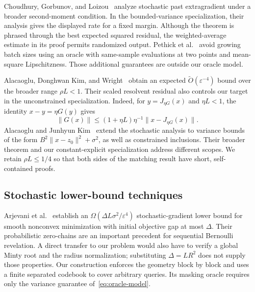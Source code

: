 \documentclass[11pt,a4paper]{article}
\newcommand{\eps}{\varepsilon}
\theoremstyle{definition}
\theoremstyle{remark}
\begin{document}
Choudhury, Gorbunov, and Loizou~\cite{cgl2023} analyze stochastic past
extragradient under a broader second-moment condition. In the bounded-variance
specialization, their analysis gives the displayed rate for a fixed margin.
Although the theorem is phrased through the best expected squared residual,
the weighted-average estimate in its proof permits randomized output.
Pethick et al.~\cite{pethick2023} avoid growing batch sizes using an oracle
with same-sample evaluations at two points and mean-square Lipschitzness.
Those additional guarantees are outside our oracle model.

Alacaoglu, Donghwan Kim, and Wright~\cite{akw2024} obtain an expected
$\widetilde O(\eps^{-4})$ bound over the broader range $\rho L<1$.
Their scaled resolvent residual also controls our target in the
unconstrained specialization. Indeed, for $y=J_{\eta G}(x)$ and $\eta L<1$,
the identity $x-y=\eta G(y)$ gives
\begin{equation}\label{eq:resolvent-conversion}
 \|G(x)\|\le(1+\eta L)\eta^{-1}\|x-J_{\eta G}(x)\|.
\end{equation}
Alacaoglu and Junhyun Kim~\cite{ak2026} extend the stochastic analysis to
variance bounds of the form $B^2\|x-z_0\|^2+\sigma^2$, as well as constrained
inclusions. Their broader theorem and our constant-explicit specialization
address different scopes. We retain $\rho L\le1/4$ so that both sides of the
matching result have short, self-contained proofs.

\subsection{Stochastic lower-bound techniques}
Arjevani et al.~\cite{arjevani2019} establish an
$\Omega(\Delta L\sigma^2/\eps^4)$ stochastic-gradient lower bound for smooth
nonconvex minimization with initial objective gap at most $\Delta$.
Their probabilistic zero-chains are an important precedent for sequential
Bernoulli revelation. A direct transfer to our problem would also have to
verify a global Minty root and the radius normalization; substituting
$\Delta=LR^2$ does not supply those properties. Our construction enforces
the geometry block by block and uses a finite separated codebook to cover
arbitrary queries. Its masking oracle requires only the variance guarantee
of~\eqref{eq:oracle-model}.
\end{document}
